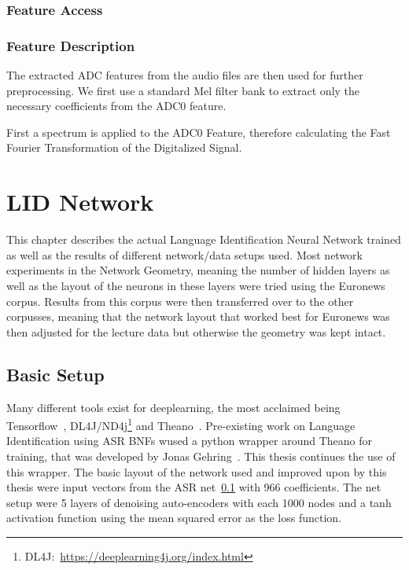 \subsection{Feature Access}
\label{sec:FP:FA}

\subsection{Feature Description}
\label{sec:FP:FD}
The extracted ADC features from the audio files are then used for further preprocessing. We first use a standard Mel filter bank to extract only the necessary coefficients from the ADC0 feature. 

First a spectrum is applied to the ADC0 Feature, therefore calculating the Fast Fourier Transformation of the Digitalized Signal.


\chapter{LID Network}
\label{ch:LIDNetwork}

This chapter describes the actual Language Identification Neural Network trained as well as the results of different network/data setups used. Most network experiments in the Network Geometry, meaning the number of hidden layers as well as the layout of the neurons in these layers were tried using the Euronews corpus. Results from this corpus were then transferred over to the other corpusses, meaning that the network layout that worked best for Euronews was then adjusted for the lecture data but otherwise the geometry was kept intact.

\section{Basic Setup}
\label{sec:LIDNetwork:Basic}

Many different tools exist for deeplearning, the most acclaimed being Tensorflow~\cite{DBLP:journals/corr/AbadiABBCCCDDDG16}, DL4J/ND4j\footnote{DL4J:~\url{https://deeplearning4j.org/index.html}} and Theano~\cite{bergstra2011theano}. Pre-existing work on Language Identification using ASR BNFs wused a python wrapper around Theano for training, that was developed by Jonas Gehring~\cite{gehringMA}. This thesis continues the use of this wrapper. The basic layout of the network used and improved upon by this thesis were input vectors from the ASR net~\ref{sec:FP:FA} with 966 coefficients. The net setup were 5 layers of denoising auto-encoders with each 1000 nodes and a tanh activation function using the mean squared error as the loss function. 


